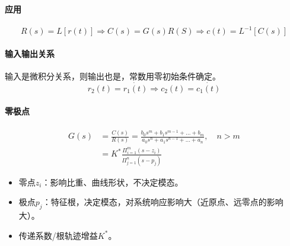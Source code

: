 \documentclass[
12pt, %
a4paper, 
oneside, %
headinclude,footinclude, %
]{scrartcl}
\begin{document}
\paragraph{应用}
$$ R(s) = L[r(t)] \Rightarrow C(s) = G(s)R(S) \Rightarrow c(t) = L^{-1}[C(s)] $$
\paragraph{输入输出关系}
输入是微积分关系，则输出也是，常数用零初始条件确定。
$$ r_2(t) = \dot{r_1(t)} \Rightarrow c_2(t) = \dot{c_1(t)} $$
\paragraph{零极点}
\begin{align*}
G(s) &= \frac{C(s)}{R(s)} = \frac{b_0 s^m + b_1 s^{m - 1} + \dots + b_m}{a_0 s^n + a_1 s^{n - 1} + \dots + a_n}, \quad n > m \\
&= K^* \frac{\Pi_{i = 1}^m (s - z_i)}{\Pi_{j = 1}^n (s - p_j)}
\end{align*}

\begin{itemize}
\item 零点$ z_i $：影响比重、曲线形状，不决定模态。
\item 极点$ p_j $：特征根，决定模态，对系统响应影响大（近原点、远零点的影响大）。
\item 传递系数/根轨迹增益$ K^* $。
\end{itemize}
\end{document}
